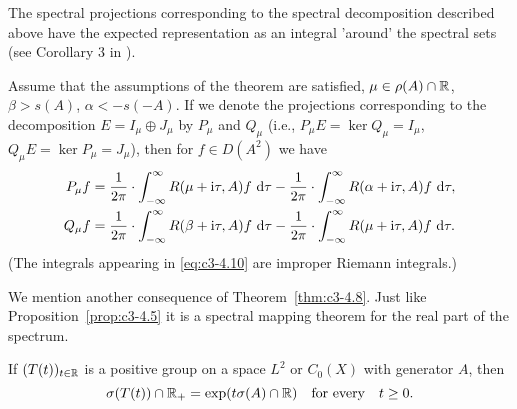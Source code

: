 The spectral projections corresponding to the spectral decomposition
described above have the expected representation as an integral
'around' the spectral sets (see Corollary 3 in \citet{greiner:1984c}).

\begin{corollary}\label{cor:c3-4.9}
Assume that the assumptions of the theorem are satisfied, $\mu \in \rho(A) \cap \mathbb{R} $, $\beta > s(A)$, $\alpha < -s(-A)$. If we denote the projections corresponding to the decomposition $E = I_{\mu} \oplus J_{\mu}$ by $P_{\mu}$ and $Q_{\mu}$
(i.e., $P_{\mu}E = \ker Q_{\mu} = I_{\mu}$, $Q_{\mu}E = \ker P_{\mu} = J_{\mu}$), then for $f \in D(A^2)$ we
have
\begin{equation}\label{eq:c3-4.10}
\begin{aligned}
	P_{\mu}f &= \frac{1}{2\pi} \cdot \int_{-\infty}^{\infty} R(\mu+\mathrm{i}\tau,A)f \, \mathop{}\!\mathrm{d}{\tau} - \frac{1}{2\pi} \cdot \int_{-\infty}^{\infty} R(\alpha+\mathrm{i}\tau,A)f \, \mathop{}\!\mathrm{d}{\tau} ,\\
	Q_{\mu}f &= \frac{1}{2\pi} \cdot \int_{-\infty}^{\infty} R(\beta+\mathrm{i}\tau,A)f \, \mathop{}\!\mathrm{d}{\tau} - \frac{1}{2\pi} \cdot \int_{-\infty}^{\infty} R(\mu+\mathrm{i}\tau,A)f \, \mathop{}\!\mathrm{d}{\tau} .
\end{aligned}
\end{equation}
(The integrals appearing in \eqref{eq:c3-4.10} are improper Riemann integrals.)
\end{corollary}
We mention another consequence of Theorem~\ref{thm:c3-4.8}. Just like Proposition~\ref{prop:c3-4.5} it is a
spectral mapping theorem for the real part of the spectrum.
%
%
\begin{corollary}\label{cor:c3-4.10}
If $(T(t))_{t \in \mathbb{R} }$ is a positive group on a space $L^2$ or
$C_0(X)$ with generator $A$, then
\begin{equation}\label{eq:c3-4.11}
	\sigma(T(t)) \cap \mathbb{R} _+ = \exp(t\sigma(A) \cap \mathbb{R} ) \quad \text{for every} \quad t \geq 0 .
\end{equation}
\end{corollary}

